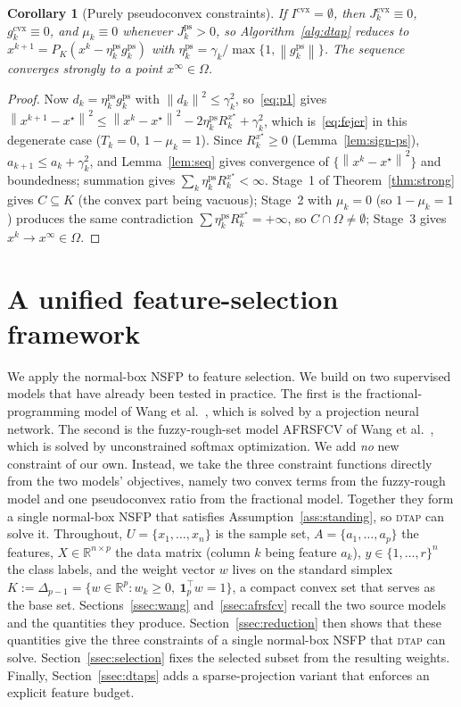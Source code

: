 \documentclass[]{interact}
\theoremstyle{plain}
\newtheorem{corollary}[theorem]{Corollary}
\theoremstyle{definition}
\theoremstyle{remark}
\newcommand{\R}{\mathbb{R}}
\newcommand{\norm}[1]{\left\lVert #1 \right\rVert}
\newcommand{\cvx}{\mathrm{cvx}}
\newcommand{\ps}{\mathrm{ps}}
\newcommand{\dtap}{\textsc{dtap}}
\begin{document}
\begin{corollary}[Purely pseudoconvex constraints]\label{cor:ps}
If $I^{\cvx}=\emptyset$, then $J^{\cvx}_k\equiv0$, $g^{\cvx}_k\equiv0$, and $\mu_k\equiv0$
whenever $J^{\ps}_k>0$, so Algorithm~\ref{alg:dtap} reduces to
$x^{k+1}=P_K(x^k-\eta^{\ps}_k g^{\ps}_k)$ with $\eta^{\ps}_k=\gamma_k/\max\{1,\norm{g^{\ps}_k}\}$.
The sequence converges strongly to a point $x^\infty\in\Omega$.
\end{corollary}
\begin{proof}
Now $d_k=\eta^{\ps}_k g^{\ps}_k$ with $\norm{d_k}^2\le\gamma_k^2$, so~\eqref{eq:p1} gives
$\norm{x^{k+1}-x^\star}^2\le\norm{x^k-x^\star}^2-2\eta^{\ps}_k R^{x^\star}_k+\gamma_k^2$,
which is~\eqref{eq:fejer} in this degenerate case ($T_k=0$, $1-\mu_k=1$). Since
$R^{x^\star}_k\ge0$ (Lemma~\ref{lem:sign-ps}), $a_{k+1}\le a_k+\gamma_k^2$, and
Lemma~\ref{lem:seq} gives convergence of $\{\norm{x^k-x^\star}^2\}$ and boundedness;
summation gives $\sum_k\eta^{\ps}_k R^{x^\star}_k<\infty$. Stage~1 of
Theorem~\ref{thm:strong} gives $C\subseteq K$ (the convex part being vacuous); Stage~2 with
$\mu_k=0$ (so $1-\mu_k=1$) produces the same contradiction $\sum\eta^{\ps}_k R^{x^\star}_k=+\infty$,
so $C\cap\Omega\ne\emptyset$; Stage~3 gives $x^k\to x^\infty\in\Omega$.
\end{proof}

\section{A unified feature-selection framework}\label{sec:fs}
We apply the normal-box NSFP to feature selection. We build on two supervised models that have already been tested in practice. The first is the fractional-programming model of Wang et al.~\citep{wang2021fractional}, which is solved by a projection neural network. The second is the fuzzy-rough-set model AFRSFCV of Wang et al.~\citep{wang2026afrsfcv}, which is solved by unconstrained softmax optimization. We add \emph{no} new constraint of our own. Instead, we take the three constraint functions directly from the two models' objectives, namely two convex terms from the fuzzy-rough model and one pseudoconvex ratio from the fractional model. Together they form a single normal-box NSFP that satisfies Assumption~\ref{ass:standing}, so \dtap{} can solve it. Throughout, $U=\{x_1,\dots,x_n\}$ is the sample set, $A=\{a_1,\dots,a_p\}$ the features, $X\in\R^{n\times p}$ the data matrix (column $k$ being feature $a_k$), $y\in\{1,\dots,r\}^n$ the class labels, and the weight vector $w$ lives on the standard simplex $K:=\Delta_{p-1}=\{w\in\R^p:w_k\ge0,\ \mathbf{1}_p^{\top}w=1\}$, a compact convex set that serves as the base set. Sections~\ref{ssec:wang} and~\ref{ssec:afrsfcv} recall the two source models and the quantities they produce. Section~\ref{ssec:reduction} then shows that these quantities give the three constraints of a single normal-box NSFP that \dtap{} can solve. Section~\ref{ssec:selection} fixes the selected subset from the resulting weights. Finally, Section~\ref{ssec:dtaps} adds a sparse-projection variant that enforces an explicit feature budget.
\end{document}
